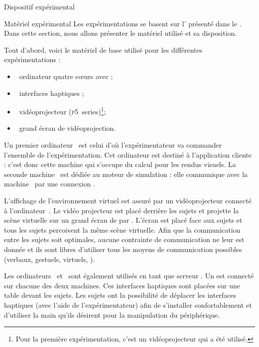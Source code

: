 \documentclass[myfrancais,ngerman,english,french]{mythesis}
\begin{document}
	\begin{mychapter}{Dispositif expérimental}
		\begin{mysection}{Matériel expérimental}
			Les expérimentations se basent sur l' présenté dans le .
			Dans cette section, nous allons présenter le matériel utilisé et sa disposition.

			Tout d'abord, voici le matériel de base utilisé pour les différentes expérimentations :
			\begin{itemize}
				\item {}~ordinateur quatre cœurs \myIntelCore avec ;
				\item {}~interfaces haptiques \myOmni;
				\item {}~vidéoprojecteur \myACER (\textsc{p5}~series)\footnote{Pour la première expérimentation, c'est un vidéoprojecteur \myCasioXJ qui a été utilisé.};
				\item {}~grand écran de vidéoprojection.
			\end{itemize}

			Un premier ordinateur~ est celui d'où l'expérimentateur va commander l'ensemble de l'expérimentation.
			Cet ordinateur est destiné à l'application cliente  : c'est donc cette machine qui s'occupe du calcul pour les rendus visuels.
			La seconde machine~ est dédiée au moteur de simulation  : elle communique avec la machine~ par une connexion \myTCPIP.

			L'affichage de l'environnement virtuel est assuré par un vidéoprojecteur connecté à l'ordinateur~.
			Le vidéo projecteur est placé derrière les sujets et projette la scène virtuelle sur un grand écran de  par .
			L'écran est placé face aux sujets et tous les sujets percoivent la même scène virtuelle.
			Afin que la communication entre les sujets soit optimales, aucune contrainte de communication ne leur est donnée et ils sont libres d'utiliser tous les moyens de communication possibles (verbaux, gestuels, virtuels, \myetc).

			Les ordinateurs~ et~ sont également utilisés en tant que serveur .
			Un \myOmni est connecté sur chacune des deux machines.
			Ces interfaces haptiques sont placées sur une table devant les sujets.
			Les sujets ont la possibilité de déplacer les interfaces haptiques (avec l'aide de l'expérimentateur) afin de s'installer confortablement et d'utiliser la main qu'ils désirent pour la manipulation du périphérique.


\end{mysection}
\end{mychapter}
\end{document}
